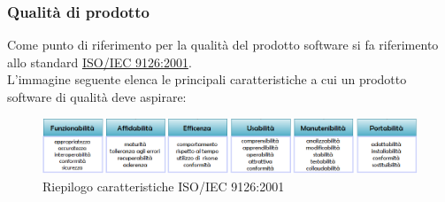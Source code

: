 \documentclass[a4paper,11pt]{article}
\begin{document}
\subsubsection{Qualità di prodotto}
Come punto di riferimento per la qualità del prodotto software si fa riferimento allo standard \underline{ISO/IEC 9126:2001}.\\
L'immagine seguente elenca le principali caratteristiche a cui un prodotto software di qualità deve aspirare:\\
\begin{figure}[h!]
\centering
\includegraphics[scale=0.55]{../images/ISO-9126-cut}
\caption{Riepilogo caratteristiche ISO/IEC 9126:2001}
\end{figure}
\end{document}
